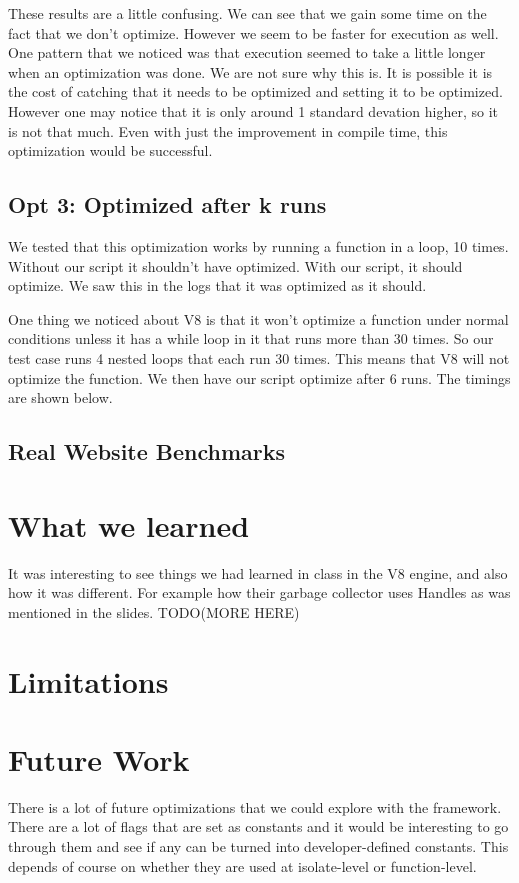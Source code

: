 \documentclass[twocolumn,showpacs,%
  nofootinbib,aps,superscriptaddress,%
  eqsecnum,prd,notitlepage,showkeys,10pt]{revtex4-1}
\begin{document}
These results are a little confusing. We can see that we gain some time on the fact that we don't optimize. However we seem to be faster for execution as well. One pattern that we noticed was that execution seemed to take a little longer when an optimization was done. We are not sure why this is. It is possible it is  the cost of catching that it needs to be optimized and setting it to be optimized. However one may notice that it is only around 1 standard devation higher, so it is not that much. Even with just the improvement in compile time, this optimization would be successful. 


\subsection{Opt 3: Optimized after k runs}
We tested that this optimization works by running a function in a loop, 10 times. Without our script it shouldn't have optimized. With our script, it should optimize. We saw this in the logs that it was optimized as it should.

One thing we noticed about V8 is that it won't optimize a function under normal conditions unless it has a while loop in it that runs more than 30 times. So our test case runs 4 nested loops that each run 30 times. This means that V8 will not optimize the function. We then have our script optimize after 6 runs. The timings are shown below.



\subsection{Real Website Benchmarks}


\section {What we learned}
It was interesting to see things we had learned in class in the V8 engine, and also how it was different. For example how their garbage collector uses Handles as was mentioned in the slides.
TODO(MORE HERE)

\section{Limitations}


\section{Future Work}
There is a lot of future optimizations that we could explore with the framework. There are a lot of flags that are set as constants and it would be interesting to go through them and see if any can be turned into developer-defined constants. This depends of course on whether they are used at isolate-level or function-level. 
\end{document}
